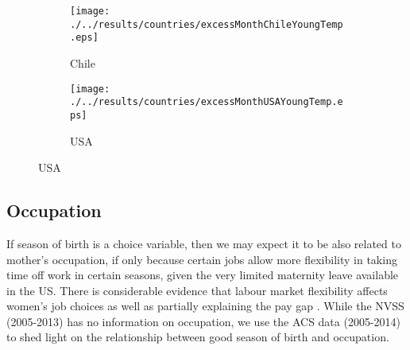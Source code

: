 \documentclass[a4paper, 11.5 pt]{article}
\theoremstyle{plain}
\begin{document}
\begin{doublespace}
\begin{figure}[htpb!]
\begin{center}
\caption{Births per Month and Temperature: Various Countries}
\label{bqFig:excessTemp}
\begin{subfigure}{.5\textwidth}
  \centering
  \texttt{[image: ./../results/countries/excessMonthChileYoungTemp.eps]}
  \caption{Chile}
  \label{fig:ChileTemp}
\end{subfigure}%
\begin{subfigure}{.5\textwidth}
  \centering
  \texttt{[image: ./../results/countries/excessMonthUSAYoungTemp.eps]}
  \caption{USA}
  \label{fig:USATemp}
\end{subfigure}
\end{center}
\end{figure}


\newpage
\subsection{Occupation}
If season of birth is a choice variable, then we may expect it to be also related to mother's occupation, if only because certain jobs allow more flexibility in taking time off work in certain seasons, given the very limited maternity leave available in the US. There is considerable evidence that labour market flexibility affects women's job choices as well as partially explaining the pay gap \citep{Goldin2014}. While the NVSS (2005-2013) has no information on occupation, we use the ACS data (2005-2014) to shed light on the relationship between good season of birth and occupation.


\end{doublespace}
\end{document}
